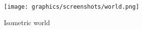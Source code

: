 \begin{figure}[H]
    \centering
    
    \texttt{[image: graphics/screenshots/world.png]}
    \caption{Isometric world}
    \label{fig:isometric_world}
\end{figure}

